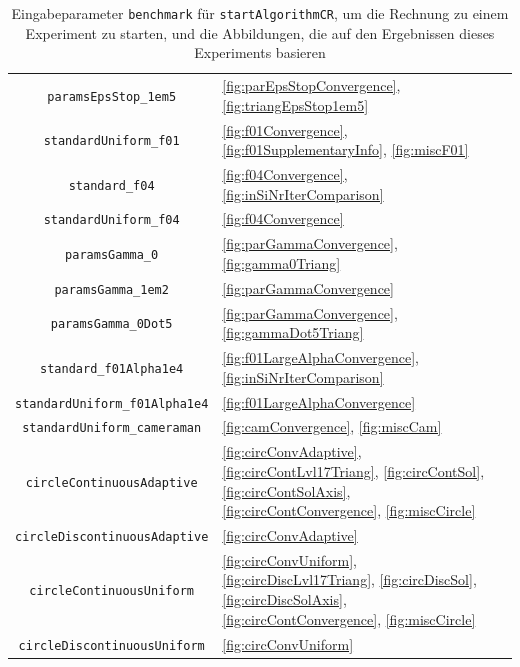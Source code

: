\begin{table}[p]
\begin{tabular}{c|p{8.7cm}}
    \texttt{paramsEpsStop\_1em5} &
    \ref{fig:parEpsStopConvergence}, \ref{fig:triangEpsStop1em5}\\
    \texttt{standardUniform\_f01} &
    \ref{fig:f01Convergence}, \ref{fig:f01SupplementaryInfo},
    \ref{fig:miscF01}\\
    \texttt{standard\_f04} &
    \ref{fig:f04Convergence}, \ref{fig:inSiNrIterComparison}\\
    \texttt{standardUniform\_f04} &
    \ref{fig:f04Convergence}\\
    \texttt{paramsGamma\_0} &
    \ref{fig:parGammaConvergence}, \ref{fig:gamma0Triang}\\
    \texttt{paramsGamma\_1em2} &
    \ref{fig:parGammaConvergence}\\
    \texttt{paramsGamma\_0Dot5} &
    \ref{fig:parGammaConvergence}, \ref{fig:gammaDot5Triang}\\
    \texttt{standard\_f01Alpha1e4} &
    \ref{fig:f01LargeAlphaConvergence}, \ref{fig:inSiNrIterComparison}\\
    \texttt{standardUniform\_f01Alpha1e4} &
    \ref{fig:f01LargeAlphaConvergence}\\
    \texttt{standardUniform\_cameraman} &
    \ref{fig:camConvergence}, \ref{fig:miscCam}\\
    \texttt{circleContinuousAdaptive} &
    \ref{fig:circConvAdaptive}, \ref{fig:circContLvl17Triang},
    \ref{fig:circContSol}, \ref{fig:circContSolAxis}, 
    \ref{fig:circContConvergence}, \ref{fig:miscCircle}\\
    \texttt{circleDiscontinuousAdaptive} &
    \ref{fig:circConvAdaptive}\\
    \texttt{circleContinuousUniform} &
    \ref{fig:circConvUniform}, \ref{fig:circDiscLvl17Triang},
    \ref{fig:circDiscSol}, \ref{fig:circDiscSolAxis},
    \ref{fig:circContConvergence}, \ref{fig:miscCircle}\\
    \texttt{circleDiscontinuousUniform} &
    \ref{fig:circConvUniform}\\
    \hline
  \end{tabular}
  \caption{Eingabeparameter \texttt{benchmark} für \texttt{startAlgorithmCR},
    um die Rechnung zu einem Experiment zu starten, und die Abbildungen, die
    auf den Ergebnissen dieses Experiments basieren} 
  \label{tab:usedBenchmarks}
\end{table} 


